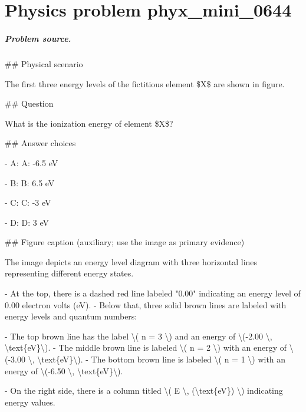 
\chapter{Physics problem phyx\_mini\_0644}
\label{ch:PhyXMiniProblems_problem_phyx_mini_0644}

\paragraph{Problem source.}
\#\# Physical scenario

The first three energy levels of the fictitious element \$X\$ are shown in figure.

\#\# Question

What is the ionization energy of element \$X\$?

\#\# Answer choices

- A: A: -6.5 eV

- B: B: 6.5 eV

- C: C: -3 eV

- D: D: 3 eV

\#\# Figure caption (auxiliary; use the image as primary evidence)

The image depicts an energy level diagram with three horizontal lines representing different energy states. 

- At the top, there is a dashed red line labeled "0.00" indicating an energy level of 0.00 electron volts (eV).
- Below that, three solid brown lines are labeled with energy levels and quantum numbers:

  - The top brown line has the label \textbackslash{}( n = 3 \textbackslash{}) and an energy of \textbackslash{}(-2.00 \textbackslash{}, \textbackslash{}text\{eV\}\textbackslash{}).
  - The middle brown line is labeled \textbackslash{}( n = 2 \textbackslash{}) with an energy of \textbackslash{}(-3.00 \textbackslash{}, \textbackslash{}text\{eV\}\textbackslash{}).
  - The bottom brown line is labeled \textbackslash{}( n = 1 \textbackslash{}) with an energy of \textbackslash{}(-6.50 \textbackslash{}, \textbackslash{}text\{eV\}\textbackslash{}).

- On the right side, there is a column titled \textbackslash{}( E \textbackslash{}, (\textbackslash{}text\{eV\}) \textbackslash{}) indicating energy values.

